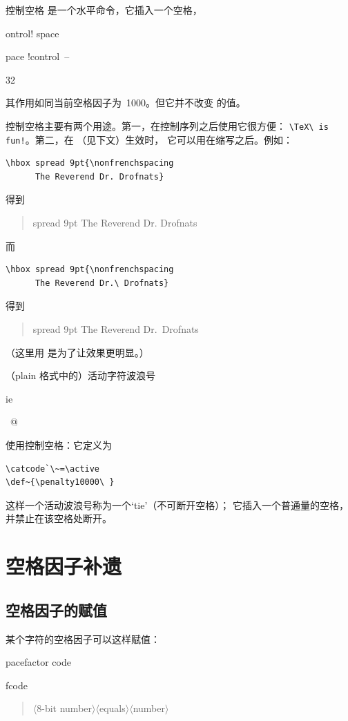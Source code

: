 \documentclass[a4paper]{rapport3}
\makeatletter
\def\gr#1{$\langle$#1$\rangle$}\def\key#1{{\tt#1}}
\newenvironment{disp}{\begin{quotation}}{\end{quotation}}
\def\term#1\par{\index{#1}}
\def\cstoidx#1\par{\index{#1@\cs{#1}}}
\def\csidx#1{\cstoidx #1\par\cs{#1}}
\makeatother
\begin{document}
控制空格  是一个水平命令，它插入一个空格，
\term control! space\par\term space !control~--\par\csidx{\char32}
其作用如同当前空格因子为~1000。但它并不改变  的值。

控制空格主要有两个用途。第一，在控制序列之后使用它很方便：
\verb+\TeX\ is fun!+。第二，在 （见下文）生效时，
它可以用在缩写之后。例如：
\begin{verbatim}
\hbox spread 9pt{\nonfrenchspacing
      The Reverend Dr. Drofnats}
\end{verbatim}
得到
\begin{disp}  \leavevmode
\hbox spread 9pt{\nonfrenchspacing
      The Reverend Dr. Drofnats}\end{disp}
而
\begin{verbatim}
\hbox spread 9pt{\nonfrenchspacing
      The Reverend Dr.\ Drofnats}
\end{verbatim}
得到
\begin{disp}  \leavevmode
\hbox spread 9pt{\nonfrenchspacing
      The Reverend Dr.\ Drofnats}\end{disp}
（这里用  是为了让效果更明显。）

（plain 格式中的）活动字符波浪号~ 
\term tie\par\term ~@\par
使用控制空格：它定义为
\begin{verbatim}
\catcode`\~=\active
\def~{\penalty10000\ }
\end{verbatim}
这样一个活动波浪号称为一个`tie'（不可断开空格）；
它插入一个普通量的空格，并禁止在该空格处断开。


\section{空格因子补遗}

\subsection{空格因子的赋值}

某个字符的空格因子可以这样赋值：
\term  spacefactor code\par\cstoidx sfcode\par
\begin{disp}\gr{8-bit number}\gr{equals}\gr{number}\end{disp}
\end{document}
